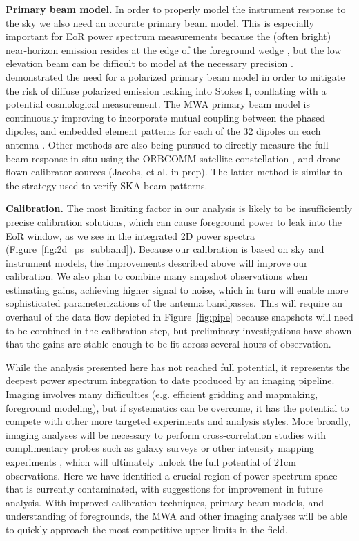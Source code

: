 \documentclass[iop]{emulateapj}
\begin{document}
\textbf{Primary beam model.} In order to properly model the instrument response to the sky
we also need an accurate primary beam model. This is especially important for EoR
power spectrum measurements because the (often bright) near-horizon emission resides
at the edge of the foreground wedge 
\citep{Pober:2016, Thyagarajan:2015, Thyagarajan:2015b}, but the low elevation beam
can be difficult to model at the necessary precision \citep{Thyagarajan:2016}. 
\citealt{Asad:2016} demonstrated the need for a polarized primary beam model in order
to mitigate the risk of diffuse polarized emission leaking into Stokes I, conflating with a 
potential cosmological measurement. The MWA
primary beam model is continuously improving to incorporate mutual coupling between the 
phased dipoles, and embedded element patterns for each of the 32 dipoles on each antenna 
\citep{Sutinjo:2015}. Other methods are also being pursued to directly measure the full beam 
response in situ using the ORBCOMM satellite constellation \citep{Neben:2015}, and 
drone-flown calibrator sources (Jacobs, et al. in prep). The latter method is similar to
the strategy \citealt{Virone:2014} used to verify SKA beam patterns.

\textbf{Calibration.} The most limiting factor in our analysis is likely to be insufficiently
precise calibration solutions, which can cause foreground power to leak into the EoR window,
as we see in the integrated 2D power spectra (Figure~\ref{fig:2d_ps_subband}).
Because our calibration is based on sky and instrument models, the improvements
described above will improve our calibration. We also plan to combine many snapshot
observations when estimating gains, achieving higher signal to noise, which in turn will
enable more sophisticated parameterizations of the antenna bandpasses. This will require
an overhaul of the data flow depicted in Figure~\ref{fig:pipe} because snapshots will need
to be combined in the calibration step, but preliminary investigations have shown that the
gains are stable enough to be fit across several hours of observation.

While the analysis presented here has not reached full potential, it represents the deepest power spectrum 
integration to date produced by an imaging pipeline. Imaging involves many difficulties (e.g. 
efficient gridding and mapmaking, foreground modeling), but if systematics can be 
overcome, it has the potential to compete with other more targeted experiments and 
analysis styles. 
More broadly, imaging analyses will be necessary to perform cross-correlation studies
with complimentary probes such as galaxy surveys or other intensity mapping experiments
 \citep[e.g.][]{DeBoer:2016, Vrbanec:2016, Beardsley:2015, Silva:2015, Dore:2014, Lidz:2009}, which will ultimately unlock the full potential of 21cm observations.
Here we have identified a crucial region of power spectrum space that is 
currently contaminated, with suggestions for improvement in future analysis. With improved 
calibration techniques, primary beam models, and understanding of foregrounds, the MWA 
and other imaging analyses will be able to quickly approach the most competitive upper 
limits in the field.
\end{document}
